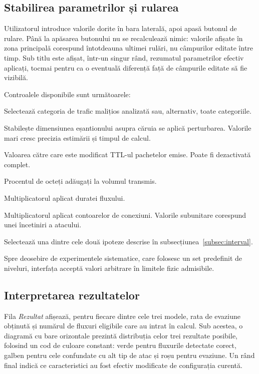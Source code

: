 \subsection{Stabilirea parametrilor și rularea}\label{subsec:parametri}

Utilizatorul introduce valorile dorite în bara laterală, apoi apasă butonul de rulare. Până la apăsarea butonului nu se recalculează nimic: valorile afișate în zona principală corespund întotdeauna ultimei rulări, nu câmpurilor editate între timp. Sub titlu este afișat, într-un singur rând, rezumatul parametrilor efectiv aplicați, tocmai pentru ca o eventuală diferență față de câmpurile editate să fie vizibilă.

Controalele disponibile sunt următoarele:

\begin{description}[style=nextline]
    \item[Clasa de atac.] Selectează categoria de trafic malițios analizată sau, alternativ, toate categoriile.
    \item[Numărul de fluxuri.] Stabilește dimensiunea eșantionului asupra căruia se aplică perturbarea. Valorile mari cresc precizia estimării și timpul de calcul.
    \item[Valoarea TTL.] Valoarea către care este modificat TTL-ul pachetelor emise. Poate fi dezactivată complet.
    \item[Umplutura.] Procentul de octeți adăugați la volumul transmis.
    \item[Factorul de durată.] Multiplicatorul aplicat duratei fluxului.
    \item[Factorul contoarelor.] Multiplicatorul aplicat contoarelor de conexiuni. Valorile subunitare corespund unei încetiniri a atacului.
    \item[Politica de context.] Selectează una dintre cele două ipoteze descrise în subsecțiunea~\ref{subsec:interval}.
\end{description}

Spre deosebire de experimentele sistematice, care folosesc un set predefinit de niveluri, interfața acceptă valori arbitrare în limitele fizic admisibile.

\subsection{Interpretarea rezultatelor}\label{subsec:interpretare}

Fila \textit{Rezultat} afișează, pentru fiecare dintre cele trei modele, rata de evaziune obținută și numărul de fluxuri eligibile care au intrat în calcul. Sub acestea, o diagramă cu bare orizontale prezintă distribuția celor trei rezultate posibile, folosind un cod de culoare constant: verde pentru fluxurile detectate corect, galben pentru cele confundate cu alt tip de atac și roșu pentru evaziune. Un rând final indică ce caracteristici au fost efectiv modificate de configurația curentă.

